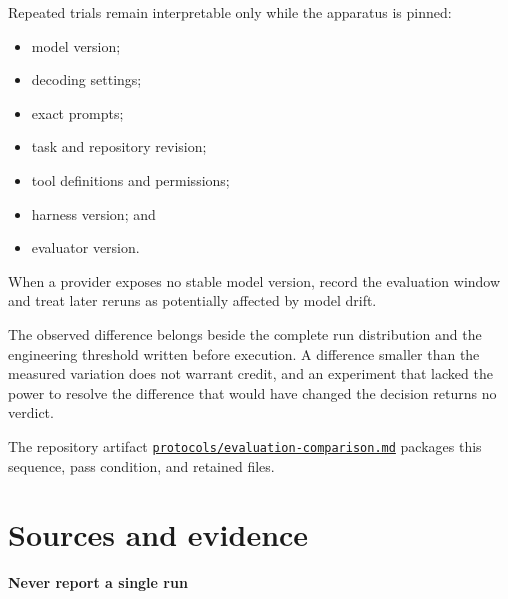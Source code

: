 Repeated trials remain interpretable only while the apparatus is pinned:

\begin{itemize}
\tightlist
\item
  model version;
\item
  decoding settings;
\item
  exact prompts;
\item
  task and repository revision;
\item
  tool definitions and permissions;
\item
  harness version; and
\item
  evaluator version.
\end{itemize}

When a provider exposes no stable model version, record the evaluation window and treat later reruns as potentially affected by model drift.

The observed difference belongs beside the complete run distribution and the engineering threshold written before execution. A difference smaller than the measured variation does not warrant credit, and an experiment that lacked the power to resolve the difference that would have changed the decision returns no verdict.

The repository artifact \href{https://github.com/sjarmak/engineering-reliable-coding-agents/blob/main/protocols/evaluation-comparison.md}{\texttt{protocols/evaluation-comparison.md}} packages this sequence, pass condition, and retained files.

\section*{Sources and evidence}

\textbf{Never report a single run}

